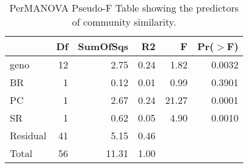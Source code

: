\begin{table}[ht]
\centering
\begin{tabular}{lrrrrr}
  \hline
 & Df & SumOfSqs & R2 & F & Pr($>$F) \\ 
  \hline
geno & 12 & 2.75 & 0.24 & 1.82 & 0.0032 \\ 
  BR & 1 & 0.12 & 0.01 & 0.99 & 0.3901 \\ 
  PC & 1 & 2.67 & 0.24 & 21.27 & 0.0001 \\ 
  SR & 1 & 0.62 & 0.05 & 4.90 & 0.0010 \\ 
  Residual & 41 & 5.15 & 0.46 &  &  \\ 
  Total & 56 & 11.31 & 1.00 &  &  \\ 
   \hline
\end{tabular}
\caption{PerMANOVA Pseudo-F Table showing the predictors of community similarity.} 
\label{tab:rcom_perm}
\end{table}
